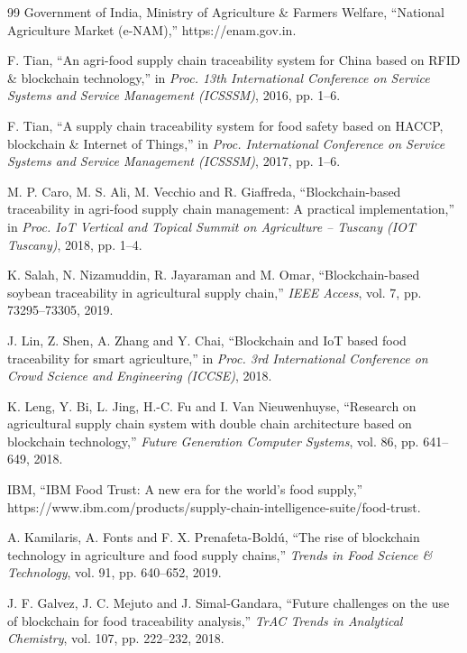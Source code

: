 
\begin{thebibliography}{99}
Government of India, Ministry of Agriculture \& Farmers Welfare, ``National Agriculture Market (e-NAM),'' https://enam.gov.in.

F. Tian, ``An agri-food supply chain traceability system for China based on RFID \& blockchain technology,'' in \textit{Proc. 13th International Conference on Service Systems and Service Management (ICSSSM)}, 2016, pp. 1--6.

F. Tian, ``A supply chain traceability system for food safety based on HACCP, blockchain \& Internet of Things,'' in \textit{Proc. International Conference on Service Systems and Service Management (ICSSSM)}, 2017, pp. 1--6.

M. P. Caro, M. S. Ali, M. Vecchio and R. Giaffreda, ``Blockchain-based traceability in agri-food supply chain management: A practical implementation,'' in \textit{Proc. IoT Vertical and Topical Summit on Agriculture -- Tuscany (IOT Tuscany)}, 2018, pp. 1--4.

K. Salah, N. Nizamuddin, R. Jayaraman and M. Omar, ``Blockchain-based soybean traceability in agricultural supply chain,'' \textit{IEEE Access}, vol. 7, pp. 73295--73305, 2019.

J. Lin, Z. Shen, A. Zhang and Y. Chai, ``Blockchain and IoT based food traceability for smart agriculture,'' in \textit{Proc. 3rd International Conference on Crowd Science and Engineering (ICCSE)}, 2018.

K. Leng, Y. Bi, L. Jing, H.-C. Fu and I. Van Nieuwenhuyse, ``Research on agricultural supply chain system with double chain architecture based on blockchain technology,'' \textit{Future Generation Computer Systems}, vol. 86, pp. 641--649, 2018.

IBM, ``IBM Food Trust: A new era for the world's food supply,'' https://www.ibm.com/products/supply-chain-intelligence-suite/food-trust.

A. Kamilaris, A. Fonts and F. X. Prenafeta-Bold\'{u}, ``The rise of blockchain technology in agriculture and food supply chains,'' \textit{Trends in Food Science \& Technology}, vol. 91, pp. 640--652, 2019.

J. F. Galvez, J. C. Mejuto and J. Simal-Gandara, ``Future challenges on the use of blockchain for food traceability analysis,'' \textit{TrAC Trends in Analytical Chemistry}, vol. 107, pp. 222--232, 2018.


\end{thebibliography}
